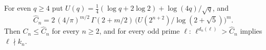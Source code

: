 For even $q\ge4$ put $U(q)=\frac14(\log q+2\log2)+\log(4q)/\sqrt q$, and
\[ \widehat C_n=2\,(4/\pi)^{m/2}\,\Gamma(2+m/2)\,\big(U(2^{n+2})/\log(2+\sqrt5)\big)^{m}. \]
Then $C_n\le\widehat C_n$ for every $n\ge2$, and for every odd prime $\ell$: $\ell^{d_n(\ell)}>\widehat C_n$ implies $\ell\nmid k_n$.
